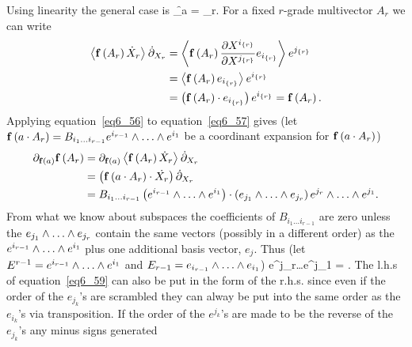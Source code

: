 Using linearity the general case is
\be
	\partial_{\f{\fbld}{a}} = \sum_{r}.\label{eq6_56}
\ee
For a fixed $r$-grade multivector $A_{r}$ we can write
\begin{align}
	\left \langle {{\mathbf{f}}\left ({A_{r}} \right )\dot{X}_{r}} \right \rangle_{}\dot{\partial}_{X_{r}} &= \left \langle {{\mathbf{f}}\left ({A_{r}} \right )\displaystyle\frac{\partial{X^{{i}_{\left \{{r}\right \}}}}}{\partial{X^{{j}_{\left \{{r}\right \}}}}}e_{{i}_{\left \{{r}\right \}}}} \right \rangle_{}e^{{j}_{\left \{{r}\right \}}} \nonumber \\
	                                                          &= \left \langle {{\mathbf{f}}\left ({A_{r}} \right )e_{{i}_{\left \{{r}\right \}}}} \right \rangle_{}e^{{i}_{\left \{{r}\right \}}} \nonumber \\
	                                                          &= \left ( {{\mathbf{f}}\left ( {A_{r}} \right )\cdot e_{{i}_{\left \{{r}\right \}}}} \right )e^{{i}_{\left \{{r}\right \}}} = {\mathbf{f}}\left ( {A_{r}} \right ). \label{eq6_57}
\end{align}
Applying equation~\ref{eq6_56} to equation~\ref{eq6_57} gives (let $\f{\fbld}{a\cdot A_{r}} = B_{i_{1}\dots i_{r-1}}e^{i_{r-1}}\W\dots\W e^{i_{1}}$ be a coordinant 
expansion for ${\mathbf{f}}\left ( {a\cdot A_{r}} \right )$)
\begin{align}
	\partial_{\f{\fbld}{a}}\f{\fbld}{A_{r}} &= \partial_{\f{\fbld}{a}}\grd{\f{\fbld}{A_{r}}\dot{X}_{r}}{}\dot{\partial}_{X_{r}} \nonumber \\
	                                        &= \paren{\f{\fbld}{a\cdot A_{r}}\cdot\dot{X_{r}}}\dot{\partial}_{X_{r}} \nonumber \\
	                                        &= B_{i_{1}\dots i_{r-1}}\paren{e^{i_{r-1}}\W\dots\W e^{i_{1}}}\cdot\paren{e_{j_{1}}\W\dots\W e_{j_{r}}}
	                                           e^{j_{r}}\W\dots\W e^{j_{1}}. \label{eq6_58}
\end{align}
From what we know about subspaces the coefficients of $B_{i_{1}\dots i_{r-1}}$ are zero unless the $e_{j_{1}}\W\dots\W e_{j_{r}}$ contain the same vectors 
(possibly in a different order) as the $e^{i_{r-1}}\W\dots\W e^{i_{1}}$ plus one additional basis vector, $e_{j}$.  Thus (let $E^{r-1} = e^{i_{r-1}}\W\dots\W e^{i_{1}}$
and $E_{r-1} = e_{i_{r-1}}\W\dots\W e_{i_{1}}$)
\be\label{eq6_59}
	\cdot{}e^{j_{r}}\W\dots\W e^{j_{1}} = 
		.
\ee
The l.h.s of equation~\ref{eq6_59} can also be put in the form of the r.h.s. since even if the order of the $e_{j_{k}}$'s are scrambled they can alway be put into
the same order as the $e_{i_{k}}$'s via transposition.  If the order of the $e^{j_{k}}$'s are made to be the reverse of the $e_{j_{k}}$'s any minus signs generated

